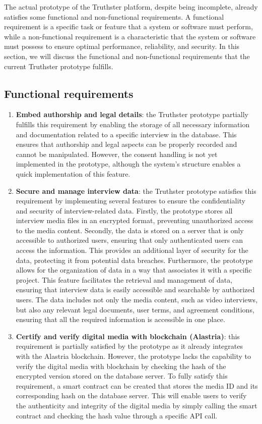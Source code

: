 \documentclass[target=mst,aauheader=]{thud}
\begin{document}
The actual prototype of the Truthster platform, despite being incomplete, already satisfies some functional and non-functional requirements. A functional requirement is a specific task or feature that a system or software must perform, while a non-functional requirement is a characteristic that the system or software must possess to ensure optimal performance, reliability, and security. In this section, we will discuss the functional and non-functional requirements that the current Truthster prototype fulfills.\par
\subsection{Functional requirements}

    \begin{enumerate}

        \item \textbf{Embed authorship and legal details}: the Truthster prototype partially fulfills this requirement by enabling the storage of all necessary information and documentation related to a specific interview in the database. This ensures that authorship and legal aspects can be properly recorded and cannot be manipulated. However, the consent handling is not yet implemented in the prototype, although the system's structure enables a quick implementation of this feature.
        \item \textbf{Secure and manage interview data}: the Truthster prototype satisfies this requirement by implementing several features to ensure the confidentiality and security of interview-related data. Firstly, the prototype stores all interview media files in an encrypted format, preventing unauthorized access to the media content. Secondly, the data is stored on a server that is only accessible to authorized users, ensuring that only authenticated users can access the information. This provides an additional layer of security for the data, protecting it from potential data breaches. Furthermore, the prototype allows for the organization of data in a way that associates it with a specific project. This feature facilitates the retrieval and management of data, ensuring that interview data is easily accessible and searchable by authorized users. The data includes not only the media content, such as video interviews, but also any relevant legal documents, user terms, and agreement conditions, ensuring that all the required information is accessible in one place.
        \item \textbf{Certify and verify digital media with blockchain (Alastria)}: this requirement is partially satisfied by the prototype as it already integrates with the Alastria blockchain. However, the prototype lacks the capability to verify the digital media with blockchain by checking the hash of the encrypted version stored on the database server. To fully satisfy this requirement, a smart contract can be created that stores the media ID and its corresponding hash on the database server. This will enable users to verify the authenticity and integrity of the digital media by simply calling the smart contract and checking the hash value through a specific API call.


\end{enumerate}
\end{document}
